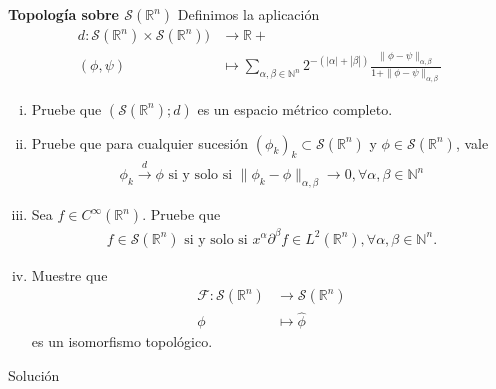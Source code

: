 \begin{homeworkProblem}
  \textbf{Topología sobre $\mathcal{S}(\mathbb{R}^{n})$} Definimos la aplicación
  \begin{align*}
    d : \mathcal{S}(\mathbb{R}^{n}) \times \mathcal{S}(\mathbb{R}^{n})) &\longrightarrow \mathbb{R}+\\
    (\phi, \psi) &\longmapsto \sum_{\alpha, \beta \in \mathbb{N}^{n}} 2^{-(|\alpha| + |\beta|)} \frac{\|\phi - \psi\|_{\alpha, \beta}}{1 + \|\phi - \psi\|_{\alpha, \beta}}
  \end{align*}
  \begin{enumerate}[(i)]
    \item Pruebe que $(\mathcal{S}(\mathbb{R}^{n}); d)$ es un espacio métrico completo.
    \item Pruebe que para cualquier sucesión $(\phi_k)_k \subset \mathcal{S}(\mathbb{R}^{n})$ y $\phi \in \mathcal{S}(\mathbb{R}^{n})$, vale
      \begin{align*}
        \phi_k \overset{d}{\to} \phi \text{ si y solo si } \|\phi_k - \phi\|_{\alpha, \beta} \to 0, \forall \alpha, \beta \in \mathbb{N}^{n}
      \end{align*}
    \item Sea $f \in C^\infty(\mathbb{R}^{n})$. Pruebe que
      \begin{align*}
        f \in \mathcal{S}(\mathbb{R}^{n}) \text{ si y solo si } x^{\alpha} \partial^{\beta}f \in L^2(\mathbb{R}^{n}), \forall \alpha, \beta \in \mathbb{N}^{n}.
      \end{align*}
    \item Muestre que
      \begin{align*}
        \mathcal{F} : \mathcal{S}(\mathbb{R}^{n}) &\longrightarrow \mathcal{S}(\mathbb{R}^{n})\\
        \phi &\longmapsto \hat{\phi}
      \end{align*}
      es un isomorfismo topológico.
  \end{enumerate}
  \begin{solution}
    Solución
  \end{solution}
\end{homeworkProblem}
